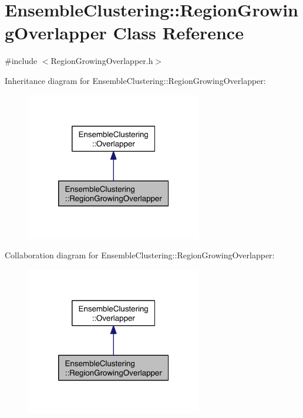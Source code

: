 \hypertarget{class_ensemble_clustering_1_1_region_growing_overlapper}{\section{Ensemble\-Clustering\-:\-:Region\-Growing\-Overlapper Class Reference}
\label{class_ensemble_clustering_1_1_region_growing_overlapper}
}


{\ttfamily \#include $<$Region\-Growing\-Overlapper.\-h$>$}



Inheritance diagram for Ensemble\-Clustering\-:\-:Region\-Growing\-Overlapper\-:\nopagebreak
\begin{figure}[H]
\begin{center}
\leavevmode
\includegraphics[width=218pt]{class_ensemble_clustering_1_1_region_growing_overlapper__inherit__graph}
\end{center}
\end{figure}


Collaboration diagram for Ensemble\-Clustering\-:\-:Region\-Growing\-Overlapper\-:\nopagebreak
\begin{figure}[H]
\begin{center}
\leavevmode
\includegraphics[width=218pt]{class_ensemble_clustering_1_1_region_growing_overlapper__coll__graph}
\end{center}
\end{figure}
